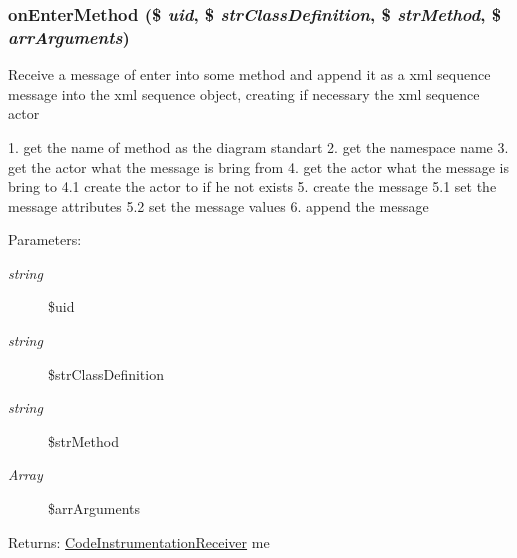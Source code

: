 \hypertarget{class_code_instrumentation_receiver_9e9c5a8aaabb5839bd53f2a4bf8738e1}{
\subsubsection[{onEnterMethod}]{\setlength{\rightskip}{0pt plus 5cm}onEnterMethod (\$ {\em uid}, \/  \$ {\em strClassDefinition}, \/  \$ {\em strMethod}, \/  \$ {\em arrArguments})}}
\label{class_code_instrumentation_receiver_9e9c5a8aaabb5839bd53f2a4bf8738e1}


Receive a message of enter into some method and append it as a xml sequence message into the xml sequence object, creating if necessary the xml sequence actor

1. get the name of method as the diagram standart 2. get the namespace name 3. get the actor what the message is bring from 4. get the actor what the message is bring to 4.1 create the actor to if he not exists 5. create the message 5.1 set the message attributes 5.2 set the message values 6. append the message

\begin{Desc}
\item[Parameters:]
\begin{description}
\item[{\em string}]\$uid \item[{\em string}]\$strClassDefinition \item[{\em string}]\$strMethod \item[{\em Array}]\$arrArguments \end{description}
\end{Desc}
\begin{Desc}
\item[Returns:]\hyperlink{class_code_instrumentation_receiver}{CodeInstrumentationReceiver} me \end{Desc}



